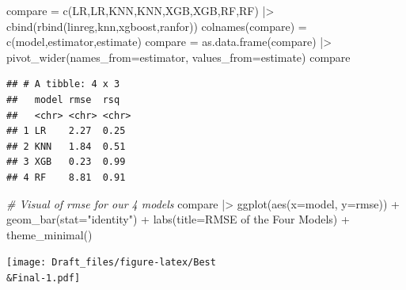 \documentclass[
]{article}
\newenvironment{Shaded}{\begin{snugshade}}{\end{snugshade}}
\newcommand{\AttributeTok}[1]{\textcolor[rgb]{0.77,0.63,0.00}{#1}}
\newcommand{\CommentTok}[1]{\textcolor[rgb]{0.56,0.35,0.01}{\textit{#1}}}
\newcommand{\FunctionTok}[1]{\textcolor[rgb]{0.00,0.00,0.00}{#1}}
\newcommand{\NormalTok}[1]{#1}
\newcommand{\OtherTok}[1]{\textcolor[rgb]{0.56,0.35,0.01}{#1}}
\newcommand{\SpecialCharTok}[1]{\textcolor[rgb]{0.00,0.00,0.00}{#1}}
\newcommand{\StringTok}[1]{\textcolor[rgb]{0.31,0.60,0.02}{#1}}
\begin{document}
\begin{Shaded}
\begin{Highlighting}[]
\NormalTok{compare }\OtherTok{=} \FunctionTok{c}\NormalTok{(}\StringTok{\textquotesingle{}LR\textquotesingle{}}\NormalTok{,}\StringTok{\textquotesingle{}LR\textquotesingle{}}\NormalTok{,}\StringTok{\textquotesingle{}KNN\textquotesingle{}}\NormalTok{,}\StringTok{\textquotesingle{}KNN\textquotesingle{}}\NormalTok{,}\StringTok{\textquotesingle{}XGB\textquotesingle{}}\NormalTok{,}\StringTok{\textquotesingle{}XGB\textquotesingle{}}\NormalTok{,}\StringTok{\textquotesingle{}RF\textquotesingle{}}\NormalTok{,}\StringTok{\textquotesingle{}RF\textquotesingle{}}\NormalTok{) }\SpecialCharTok{|\textgreater{}} \FunctionTok{cbind}\NormalTok{(}\FunctionTok{rbind}\NormalTok{(linreg,knn,xgboost,ranfor))}
\FunctionTok{colnames}\NormalTok{(compare) }\OtherTok{=} \FunctionTok{c}\NormalTok{(}\StringTok{\textquotesingle{}model\textquotesingle{}}\NormalTok{,}\StringTok{\textquotesingle{}estimator\textquotesingle{}}\NormalTok{,}\StringTok{\textquotesingle{}estimate\textquotesingle{}}\NormalTok{) }
\NormalTok{compare }\OtherTok{=} \FunctionTok{as.data.frame}\NormalTok{(compare) }\SpecialCharTok{|\textgreater{}} \FunctionTok{pivot\_wider}\NormalTok{(}\AttributeTok{names\_from=}\NormalTok{estimator, }\AttributeTok{values\_from=}\NormalTok{estimate)}
\NormalTok{compare}
\end{Highlighting}
\end{Shaded}

\begin{verbatim}
## # A tibble: 4 x 3
##   model rmse  rsq  
##   <chr> <chr> <chr>
## 1 LR    2.27  0.25 
## 2 KNN   1.84  0.51 
## 3 XGB   0.23  0.99 
## 4 RF    8.81  0.91
\end{verbatim}

\begin{Shaded}
\begin{Highlighting}[]
\CommentTok{\# Visual of rmse for our 4 models}
\NormalTok{compare }\SpecialCharTok{|\textgreater{}} \FunctionTok{ggplot}\NormalTok{(}\FunctionTok{aes}\NormalTok{(}\AttributeTok{x=}\NormalTok{model, }\AttributeTok{y=}\NormalTok{rmse)) }\SpecialCharTok{+} 
  \FunctionTok{geom\_bar}\NormalTok{(}\AttributeTok{stat=}\StringTok{"identity"}\NormalTok{) }\SpecialCharTok{+} 
  \FunctionTok{labs}\NormalTok{(}\AttributeTok{title=}\StringTok{\textquotesingle{}RMSE of the Four Models\textquotesingle{}}\NormalTok{) }\SpecialCharTok{+}
  \FunctionTok{theme\_minimal}\NormalTok{()}
\end{Highlighting}
\end{Shaded}

\texttt{[image: Draft\_files/figure-latex/Best\\\&Final-1.pdf]}
\end{document}
